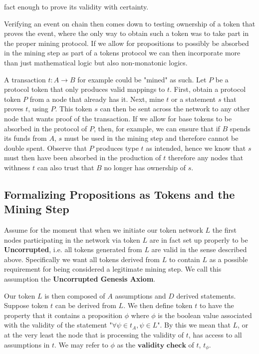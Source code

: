 \documentclass[12pt]{amsart}
\begin{document}
fact enough to prove its validity with certainty.  \newline

Verifying an event on chain then comes down to testing ownership of a token that proves the event, where the only way to obtain such a token was to take part in the proper mining protocol. If we allow for propositions to possibly be absorbed in the mining step as part of a tokens protocol we can then incorporate more than just mathematical logic but also non-monatonic logics.\newline

A transaction $t:A\rightarrow B$ for example could be "mined" as such. Let $P$ be a protocol token that only produces valid mappings to $t$. First, obtain a protocol token $P$ from a node that already has it. Next, mine $t$ or a statement $s$ that proves $t$, using $P$. This token $s$ can then be sent across the network to any other node that wants proof of the transaction. If we allow for base tokens to be absorbed in the protocol of $P$, then, for example, we can ensure that if $B$ spends its funds from $A$, $s$ must be used in the mining step and therefore cannot be double spent. Observe that $P$ produces type $t$ as intended, hence we know that $s$ must then have been absorbed in the production of $t$ therefore any nodes that withness $t$ can also trust that $B$ no longer has ownership of $s$.

\subsection{Formalizing Propositions as Tokens and the Mining Step}

Assume for the moment that when we initiate our token network $L$ the first nodes participating in the network via token $L$ are in fact set up properly to be \textbf{Uncorrupted}, i.e. all tokens generated from $L$ are valid in the sense described above. Specifically we want all tokens derived from $L$ to contain $L$ as a possible requirement for being considered a legitimate mining step. We call this assumption the \textbf{Uncorrupted Genesis Axiom}. \newline


Our token $L$ is then composed of $A$ assumptions and $D$ derived statements. Suppose token $t$ can be derived from $L$. We then define token $t$ to have the property that it contains a proposition $\phi$ where $\phi$ is the boolean value associated with the validity of the statement "$\forall \psi\in t_A , \psi\in L$". By this we mean that $L$, or at the very least the node that is processing the validity of $t$, has access to all assumptions in $t$. We may refer to $\phi$ as the $\textbf{validity check}$ of $t$, $t_\phi$.
\end{document}
